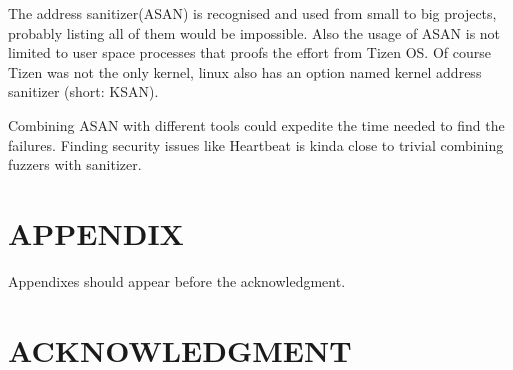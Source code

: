 \documentclass[letterpaper, 10 pt, conference]{ieeeconf}  %
\let\cite\parencite
\begin{document}
The address sanitizer(ASAN) is recognised and used from small to big projects, probably listing all of them would be impossible. Also the usage of ASAN is not limited to user space processes that proofs the effort from Tizen OS\cite{barinov2017applying}. Of course Tizen was not the only kernel, linux\cite{samsonov2013new} also has an option named kernel address sanitizer (short: KSAN).

Combining ASAN with different tools could expedite the time needed to find the failures. Finding security issues like Heartbeat\cite{alkazimi2016heartbleed} is kinda close to trivial combining fuzzers\cite{bohme2017directed} with sanitizer.


\addtolength{\textheight}{-12cm}   %







\section*{APPENDIX}

Appendixes should appear before the acknowledgment.

\section*{ACKNOWLEDGMENT}




\printbibliography
\end{document}
